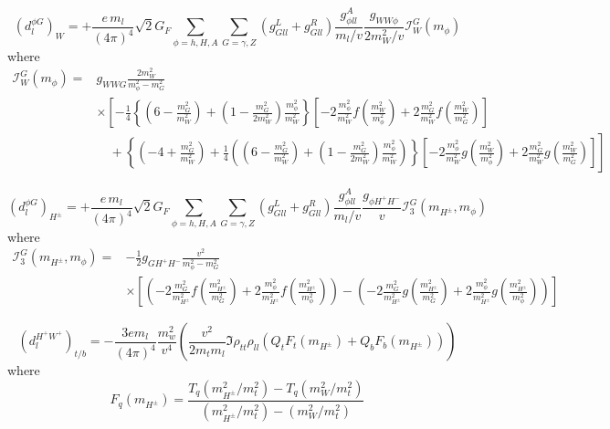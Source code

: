 \begin{equation}\label{eq:BarrZee-phiG-Wloop}
	(d^{\phi G}_{l})_{W} = +\frac{e\,m_{l}}{(4\pi)^{4}}\sqrt{2}G_{F}\sum_{\phi=h,H,A}\sum_{G=\gamma,Z}(g_{Gll}^{L}+g_{Gll}^{R})\frac{g_{\phi ll}^{A}}{m_{l}/v}\frac{g_{WW\phi}}{2m_{W}^{2}/v}\mathcal{I}_{W}^{G}(m_{\phi})
\end{equation}
where
\begin{align}
	\mathcal{I}_{W}^{G}(m_{\phi}) = &g_{WWG}\frac{2m_{W}^{2}}{m_{\phi}^{2}-m_{G}^{2}} \nonumber \\
	& \times \left[-\frac{1}{4}\left\{\left(6-\frac{m_{G}^{2}}{m_{W}^{2}}\right) + \left(1-\frac{m_{G}^{2}}{2m_{W}^{2}}\right)\frac{m_{\phi}^{2}}{m_{W}^{2}}\right\}
	\left[-2\frac{m_{\phi}^{2}}{m_{W}^{2}} f\left(\frac{m_{W}^{2}}{m_{\phi}^{2}}\right) + 2\frac{m_{G}^{2}}{m_{W}^{2}} f\left(\frac{m_{W}^{2}}{m_{G}^{2}}\right)\right]\right. \nonumber \\
	&\left. \quad + \left\{\left(-4+\frac{m_{G}^{2}}{m_{W}^{2}}\right) + \frac{1}{4}\left(\left(6-\frac{m_{G}^{2}}{m_{W}^{2}}\right) + \left(1-\frac{m_{G}^{2}}{2m_{W}^{2}}\right)\frac{m_{\phi}^{2}}{m_{W}^{2}}\right)\right\}
	\left[-2\frac{m_{\phi}^{2}}{m_{W}^{2}} g\left(\frac{m_{W}^{2}}{m_{\phi}^{2}}\right) + 2\frac{m_{G}^{2}}{m_{W}^{2}} g\left(\frac{m_{W}^{2}}{m_{G}^{2}}\right)\right]\right]
\end{align}

\begin{equation}\label{eq:BarrZee-phiG-cHloop}
	(d^{\phi G}_{l})_{H^{\pm}} = +\frac{e\,m_{l}}{(4\pi)^{4}}\sqrt{2}G_{F}\sum_{\phi=h,H,A}\sum_{G=\gamma,Z}(g_{Gll}^{L}+g_{Gll}^{R})\frac{g_{\phi ll}^{A}}{m_{l}/v}\frac{g_{\phi H^{+}H^{-}}}{v}\mathcal{I}_{3}^{G}(m_{H^{\pm}}, m_{\phi})
\end{equation}
where
\begin{align}
	\mathcal{I}_{3}^{G}(m_{H^{\pm}}, m_{\phi}) =& -\frac{1}{2}g_{GH^{+}H^{-}}\frac{v^{2}}{m_{\phi}^{2}-m_{G}^{2}} \nonumber \\
	& \times \left[\left(-2\frac{m_{G}^{2}}{m_{H^{\pm}}^{2}} f\left(\frac{m_{H^{\pm}}^{2}}{m_{G}^{2}}\right) + 2\frac{m_{\phi}^{2}}{m_{H^{\pm}}^{2}} f\left(\frac{m_{H^{\pm}}^{2}}{m_{\phi}^{2}}\right)\right)
	-\left(-2\frac{m_{G}^{2}}{m_{H^{\pm}}^{2}} g\left(\frac{m_{H^{\pm}}^{2}}{m_{G}^{2}}\right) + 2\frac{m_{\phi}^{2}}{m_{H^{\pm}}^{2}} g\left(\frac{m_{H^{\pm}}^{2}}{m_{\phi}^{2}}\right)\right)\right]
\end{align}

\begin{equation}\label{eq:BarrZee-cHW-tbloop}
	(d^{H^{+}W^{+}}_{l})_{t/b} = -\frac{3e m_{l}}{(4\pi)^{4}}\frac{m_{w}^{2}}{v^{4}}
	\left(\frac{v^{2}}{2m_{t}m_{l}}\Im{\rho_{tt}\rho_{ll}}\left(Q_{t}F_{t}(m_{H^{\pm}})+Q_{b}F_{b}(m_{H^{\pm}})\right)\right)
\end{equation}
where
\begin{equation}
	F_{q}(m_{H^{\pm}}) = \frac{T_{q}(m_{H^{\pm}}^{2}/m_{t}^{2}) - T_{q}(m_{W}^{2}/m_{t}^{2})}{(m_{H^{\pm}}^{2}/m_{t}^{2}) - (m_{W}^{2}/m_{t}^{2})}
\end{equation}


